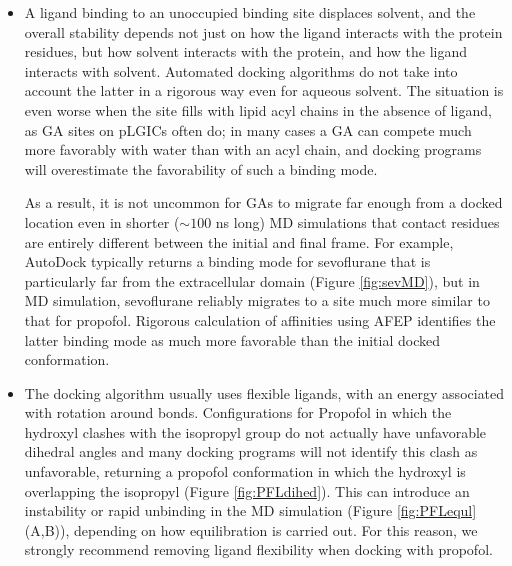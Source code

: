 \documentclass[12pt]{article}
\begin{document}
\begin{itemize}
	\item  A ligand binding to an unoccupied binding site displaces solvent, and the overall stability depends not just on how the ligand interacts with the protein residues, but how solvent interacts with the protein, and how the ligand interacts with solvent.  Automated docking algorithms do not take into account the latter in a rigorous way even for aqueous solvent. The situation is even worse when the site fills with lipid acyl chains in the absence of ligand, as GA sites on pLGICs often do;  in many cases a GA can compete much more favorably with water than with an acyl chain, and docking programs will overestimate the favorability of such a binding mode.   %
	
	As a result, it is not uncommon for GAs to migrate far enough from a docked location even in shorter ($\sim 100$ ns long) MD simulations that contact residues are entirely different between the initial and final frame. For example, AutoDock typically returns a binding mode for sevoflurane that is particularly far from the extracellular domain (Figure \ref{fig:sevMD}), but in MD simulation, sevoflurane reliably migrates to a site much more similar to that for propofol.  Rigorous calculation of affinities using AFEP identifies the latter binding mode as much more favorable than the initial docked conformation.  
	
	\item The docking algorithm usually uses flexible ligands, with an energy associated with rotation around bonds.  Configurations for Propofol in which the hydroxyl clashes with the isopropyl group do not actually have unfavorable dihedral angles and many docking programs will not identify this clash as unfavorable, returning a propofol conformation in which the hydroxyl is overlapping the isopropyl (Figure \ref{fig:PFLdihed}).  This can  introduce an instability or rapid unbinding in the MD simulation (Figure \ref{fig:PFLequl} (A,B)), depending on how equilibration is carried out.  For this reason, we strongly recommend removing ligand flexibility when docking with propofol.  
\end{itemize}
 	
\end{document}
